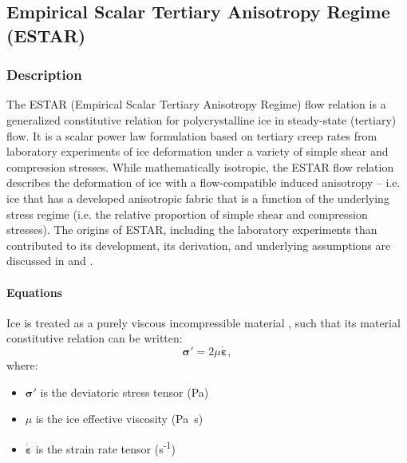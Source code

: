 
\subsection{Empirical Scalar Tertiary Anisotropy Regime (ESTAR)} \label{sec:using-issm-parameterization-estar}
\subsubsection{Description}
The ESTAR (Empirical Scalar Tertiary Anisotropy Regime) flow relation \citep{Budd2013,Graham2018} is a generalized constitutive relation for polycrystalline ice in steady-state (tertiary) flow. It is a scalar power law formulation based on tertiary creep rates from laboratory experiments of ice deformation under a variety of simple shear and compression stresses. While mathematically isotropic, the ESTAR flow relation describes the deformation of ice with a flow-compatible induced anisotropy -- i.e. ice that has a developed anisotropic fabric that is a function of the underlying stress regime (i.e. the relative proportion of simple shear and compression stresses). The origins of ESTAR, including the laboratory experiments than contributed to its development, its derivation, and underlying assumptions are discussed in \cite{Budd2013} and \cite{Graham2018}.

\paragraph{Equations}
Ice is treated as a purely viscous incompressible material \citep{Cuffey2010}, such that its material constitutive relation can be written:
\begin{equation}
	{\boldsymbol\sigma'} = 2 \mu \dot{ {\boldsymbol\varepsilon}},
\end{equation}
where:
\begin{itemize}
	\item ${\boldsymbol\sigma'}$ is the deviatoric stress tensor (Pa)
	\item $\mu$ is the ice effective viscosity (Pa~s)
	\item $\dot{ {\boldsymbol\varepsilon}}$ is the strain rate tensor (s\textsuperscript{-1})
\end{itemize}


